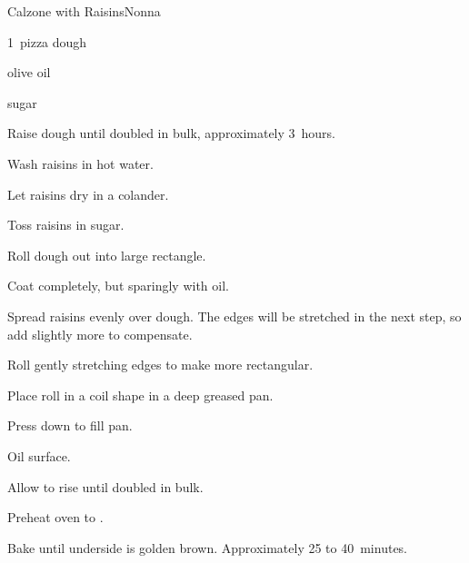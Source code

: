 \begin{recipe}{Calzone with Raisins}{Nonna}{}

\begin{ingredients}
\item 1~pizza dough
\item olive oil
\item {} 
\item {} sugar
\end{ingredients}

\begin{directions}
\item Raise dough until doubled in bulk, approximately 3~hours.
\item Wash raisins in hot water.
\item Let raisins dry in a colander.
\item Toss raisins in sugar.
\item Roll dough out into large rectangle.
\item Coat completely, but sparingly with oil.
\item Spread raisins evenly over dough. The edges will be stretched in the next step, so add slightly more to compensate.
\item Roll gently stretching edges to make more rectangular.
\item Place roll in a coil shape in a deep greased pan.
\item Press down to fill pan.
\item Oil surface.
\item Allow to rise until doubled in bulk.
\item Preheat oven to .
\item Bake until underside is golden brown. Approximately 25 to 40~minutes.
\end{directions}

\end{recipe}

